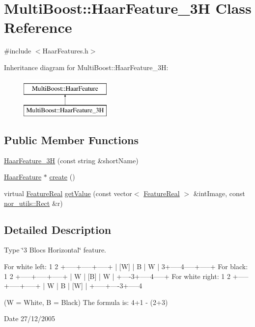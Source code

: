 \hypertarget{classMultiBoost_1_1HaarFeature__3H}{
\section{MultiBoost::HaarFeature\_\-3H Class Reference}
\label{classMultiBoost_1_1HaarFeature__3H}
}


{\ttfamily \#include $<$HaarFeatures.h$>$}

Inheritance diagram for MultiBoost::HaarFeature\_\-3H:\begin{figure}[H]
\begin{center}
\leavevmode
\includegraphics[height=2.000000cm]{classMultiBoost_1_1HaarFeature__3H}
\end{center}
\end{figure}
\subsection*{Public Member Functions}
\begin{DoxyCompactItemize}
\item 
\hyperlink{classMultiBoost_1_1HaarFeature__3H_a614371068ae000149d7ff61f8335f457}{HaarFeature\_\-3H} (const string \&shortName)
\item 
\hyperlink{classMultiBoost_1_1HaarFeature}{HaarFeature} $\ast$ \hyperlink{classMultiBoost_1_1HaarFeature__3H_a57d9d009bcfa1ecd8ce83765614db68e}{create} ()
\item 
virtual \hyperlink{Defaults_8h_a3a11cfe6a5d469d921716ca6291e934f}{FeatureReal} \hyperlink{classMultiBoost_1_1HaarFeature__3H_ad4f1d3e2419a439f6866be7353e657ab}{getValue} (const vector$<$ \hyperlink{Defaults_8h_a3a11cfe6a5d469d921716ca6291e934f}{FeatureReal} $>$ \&intImage, const \hyperlink{structnor__utils_1_1Rect}{nor\_\-utils::Rect} \&r)
\end{DoxyCompactItemize}


\subsection{Detailed Description}
Type \char`\"{}3 Blocs Horizontal\char`\"{} feature. \begin{DoxyVerb}
	 For white left:
	 1      2
	 +-----+-----+-----+
	 | [W] |  B  |  W  |
	 3+-----4-----+-----+
	 For black:
	 1      2
	 +-----+-----+-----+
	 |  W  | [B] |  W  |
	 +----3+-----4-----+
	 For white right:
	 1      2
	 +-----+-----+-----+
	 |  W  |  B  | [W] |
	 +-----+----3+-----4
	 \end{DoxyVerb}
 (W = White, B = Black) The formula is: 4+1 -\/ (2+3) \begin{DoxyDate}{Date}
27/12/2005 
\end{DoxyDate}


